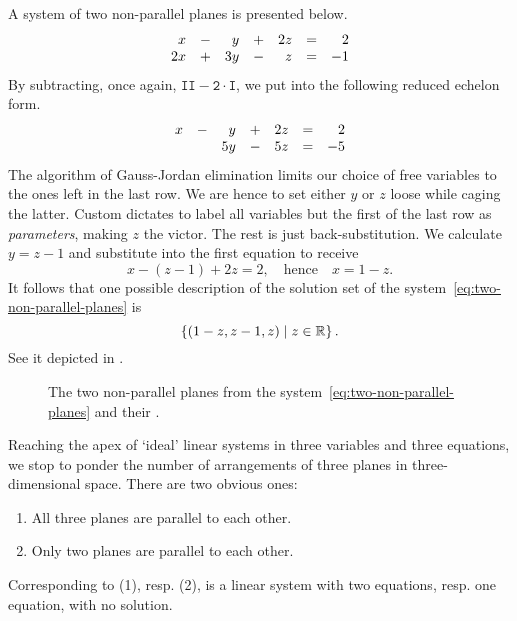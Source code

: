 A system of two non-parallel planes is presented below.
\begin{equation}
 \label{eq:two-non-parallel-planes}
 \begin{array}{r c r c r c r}
  x & - & y & + & 2z & = & 2\\
  2x & + & 3y & - & z & = & -1
 \end{array}
\end{equation}
By subtracting, once again, $\mathtt{II - 2 \cdot I}$, we put into the following
reduced echelon form.
\[
 \begin{array}{r c r c r c r}
  x & - & y & + & 2z & = & 2\\
    &   & 5y & - & 5z & = & -5
 \end{array}
\]
The algorithm of Gauss-Jordan elimination limits our choice of free variables to
the ones left in the last row. We are hence to set either $y$ or $z$ loose while
caging the latter. Custom dictates to label all variables but the first of the
last row as \emph{parameters}, making $z$ the victor. The rest is just
back-substitution. We calculate $y = z - 1$ and substitute into the first
equation to receive
\[
 x - (z - 1) + 2z = 2, \quad \text{hence} \quad x = 1 - z.
\]
It follows that one possible description of the solution set of the
system~\eqref{eq:two-non-parallel-planes} is
\[
 \left\{ (1 - z, z - 1, z) \mid z \in \mathbb{R}\right\}.
\]
See it depicted in .
\begin{figure}[ht]
 \centering

 \caption{The two non-parallel planes from the
 system~\eqref{eq:two-non-parallel-planes} and their .}
 \label{fig:two-non-parallel-planes}
\end{figure}

Reaching the apex of `ideal' linear systems in three variables and three
equations, we stop to ponder the number of arrangements of three planes in
three-dimensional space. There are two obvious ones:
\begin{enumerate}
 \item All three planes are parallel to each other.
 \item Only two planes are parallel to each other.
\end{enumerate}
Corresponding to (1), resp. (2), is a linear system with two equations, resp.
one equation, with no solution.

